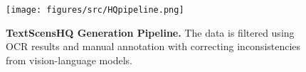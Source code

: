 \begin{figure}
    \centering
    \texttt{[image: figures/src/HQpipeline.png]}
    \caption{
    \textbf{TextScensHQ Generation Pipeline.}
    The data is filtered using OCR results and manual annotation with correcting inconsistencies from vision-language models.
    }
    \label{fig:high_quality_ppl}
\end{figure}